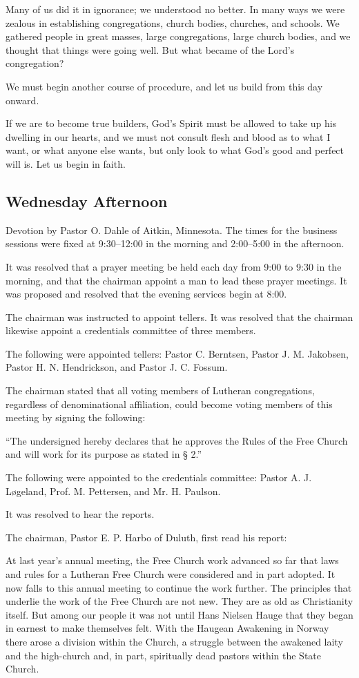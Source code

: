 Many of us did it in ignorance; we understood no better. In many ways we were zealous in establishing congregations, church bodies, churches, and schools. We gathered people in great masses, large congregations, large church bodies, and we thought that things were going well. But what became of the Lord’s congregation?

We must begin another course of procedure, and let us build from this day onward.

If we are to become true builders, God’s Spirit must be allowed to take up his dwelling in our hearts, and we must not consult flesh and blood as to what I want, or what anyone else wants, but only look to what God’s good and perfect will is. Let us begin in faith.

\subsection{Wednesday Afternoon}

Devotion by Pastor O. Dahle of Aitkin, Minnesota. The times for the business sessions were fixed at 9:30–12:00 in the morning and 2:00–5:00 in the afternoon.

It was resolved that a prayer meeting be held each day from 9:00 to 9:30 in the morning, and that the chairman appoint a man to lead these prayer meetings. It was proposed and resolved that the evening services begin at 8:00.

The chairman was instructed to appoint tellers. It was resolved that the chairman likewise appoint a credentials committee of three members.

The following were appointed tellers: Pastor C. Berntsen, Pastor J. M. Jakobsen, Pastor H. N. Hendrickson, and Pastor J. C. Fossum.

The chairman stated that all voting members of Lutheran congregations, regardless of denominational affiliation, could become voting members of this meeting by signing the following:

“The undersigned hereby declares that he approves the Rules of the Free Church and will work for its purpose as stated in § 2.”

The following were appointed to the credentials committee: Pastor A. J. Løgeland, Prof. M. Pettersen, and Mr. H. Paulson.

It was resolved to hear the reports.

The chairman, Pastor E. P. Harbo of Duluth, first read his report:

At last year’s annual meeting, the Free Church work advanced so far that laws and rules for a Lutheran Free Church were considered and in part adopted. It now falls to this annual meeting to continue the work further. The principles that underlie the work of the Free Church are not new. They are as old as Christianity itself. But among our people it was not until Hans Nielsen Hauge that they began in earnest to make themselves felt. With the Haugean Awakening in Norway there arose a division within the Church, a struggle between the awakened laity and the high-church and, in part, spiritually dead pastors within the State Church.

